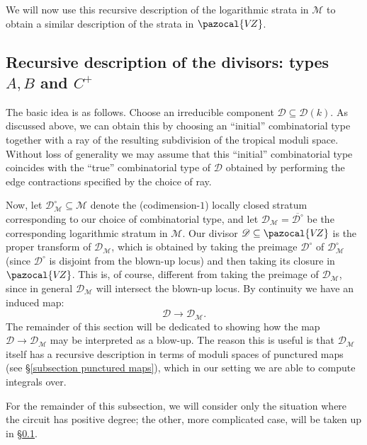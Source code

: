 \documentclass[11pt]{amsart}
\newcommand{\VZ}{\pazocal{V\!Z}}
\renewcommand{\to}{\rightarrow}
\newcommand{\Mcal}{\mathcal{M}}
\newcommand{\Dcal}{\mathcal{D}}
\theoremstyle{definition}
\theoremstyle{definition}
\begin{document}
We will now use this recursive description of the logarithmic strata in $\Mcal$ to obtain a similar description of the strata in $\VZ$.



\subsection{Recursive description of the divisors: types $A,B$ and $C^+$}

The basic idea is as follows. Choose an irreducible component $\Dcal \subseteq \Dcal(k)$. As discussed above, we can obtain this by choosing an ``initial'' combinatorial type together with a ray of the resulting subdivision of the tropical moduli space. Without loss of generality we may assume that this ``initial'' combinatorial type coincides with the ``true'' combinatorial type of $\Dcal$ obtained by performing the edge contractions specified by the choice of ray.

Now, let $\Dcal_{\Mcal}^\circ\subseteq \Mcal$ denote the (codimension-$1$) locally closed stratum corresponding to our choice of combinatorial type, and let $\Dcal_\Mcal = \overline{\Dcal^\circ}$ be the corresponding logarithmic stratum in $\Mcal$. Our divisor $\Dcal\subseteq\VZ$ is the proper transform of $\Dcal_\Mcal$, which is obtained by taking the preimage $\Dcal^\circ$ of $\Dcal_\Mcal^\circ$ (since $\Dcal^\circ$ is disjoint from the blown-up locus) and then taking its closure in $\VZ$. This is, of course, different from taking the preimage of $\Dcal_\Mcal$, since in general $\Dcal_\Mcal$ will intersect the blown-up locus. By continuity we have an induced map:
\begin{equation*} \Dcal \to \Dcal_\Mcal. \end{equation*}
The remainder of this section will be dedicated to showing how the map $\Dcal \to \Dcal_\Mcal$ may be interpreted as a blow-up. The reason this is useful is that $\Dcal_\Mcal$ itself has a recursive description in terms of moduli spaces of punctured maps (see \S \ref{subsection punctured maps}), which in our setting we are able to compute integrals over.

For the remainder of this subsection, we will consider only the situation where the circuit has positive degree; the other, more complicated case, will be taken up in \S \ref{}.
\end{document}
